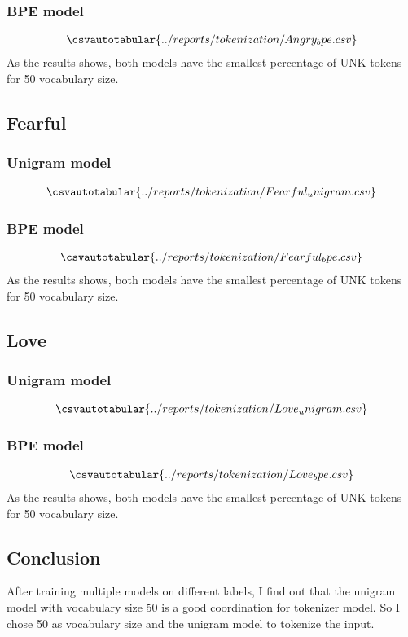 \documentclass[a4paper]{article}
\begin{document}
\subsubsection{BPE model}
\begin{align*}
	\csvautotabular{../reports/tokenization/Angry_bpe.csv}
\end{align*} 
As the results shows, both models have the smallest percentage of UNK tokens for 50 vocabulary size.

\subsection{Fearful}
\subsubsection{Unigram model}
\begin{align*}
	\csvautotabular{../reports/tokenization/Fearful_unigram.csv}
\end{align*} 
\subsubsection{BPE model}
\begin{align*}
	\csvautotabular{../reports/tokenization/Fearful_bpe.csv}
\end{align*} 
As the results shows, both models have the smallest percentage of UNK tokens for 50 vocabulary size.

\subsection{Love}
\subsubsection{Unigram model}
\begin{align*}
	\csvautotabular{../reports/tokenization/Love_unigram.csv}
\end{align*} 
\subsubsection{BPE model}
\begin{align*}
	\csvautotabular{../reports/tokenization/Love_bpe.csv}
\end{align*} 
As the results shows, both models have the smallest percentage of UNK tokens for 50 vocabulary size.

\subsection{Conclusion}
After training multiple models on different labels, I find out that the unigram model with vocabulary size 50 is a good coordination for tokenizer model. So I chose 50 as vocabulary size and the unigram model to tokenize the input.
\bigskip
\end{document}
